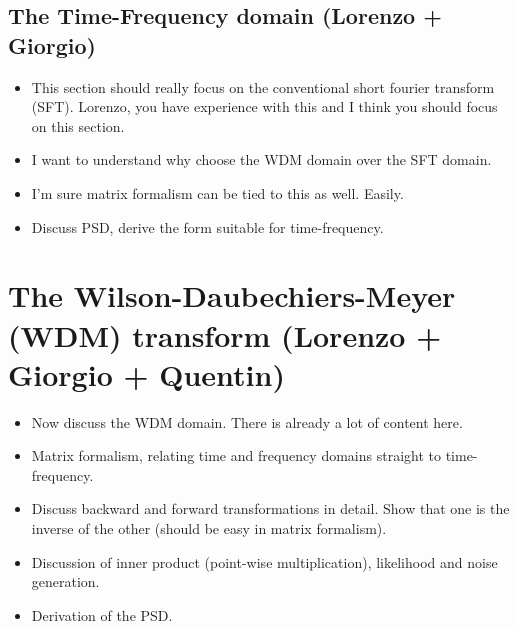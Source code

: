 \documentclass[%
 reprint,
superscriptaddress,
nofootinbib,
 amsmath,amssymb,
 aps,
colorlinks = true, 
linkcolor = blue, 
urlcolor = blue, 
citecolor = blue, 
anchorcolor = blue,
]{revtex4-2}
\begin{document}






\subsection{The Time-Frequency domain (Lorenzo + Giorgio)}
\begin{itemize}
\item This section should really focus on the conventional short fourier transform (SFT). Lorenzo, you have experience with this and I think you should focus on this section. 
\item I want to understand why choose the WDM domain over the SFT domain.  
\item I'm sure matrix formalism can be tied to this as well. Easily.
\item Discuss PSD, derive the form suitable for time-frequency.
\end{itemize}

\section{The Wilson-Daubechiers-Meyer (WDM) transform (Lorenzo + Giorgio + Quentin)}
\begin{itemize}
\item Now discuss the WDM domain. There is already a lot of content here. 
\item Matrix formalism, relating time and frequency domains straight to time-frequency. 
\item Discuss backward and forward transformations in detail. Show that one is the inverse of the other (should be easy in matrix formalism). 
\item Discussion of inner product (point-wise multiplication), likelihood and noise generation. 
\item Derivation of the PSD. 
\end{itemize}
\end{document}
